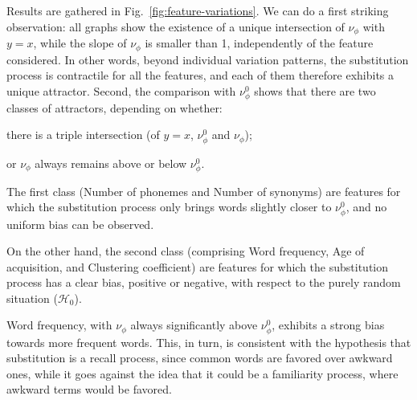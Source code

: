 \medskip
Results are gathered in Fig.~\ref{fig:feature-variations}.
We can do a first striking observation: all graphs show the existence of a unique intersection of $\nu_{\phi}$ with $y=x$, while the slope of $\nu_{\phi}$ is smaller than 1, independently of the feature considered.
In other words, beyond individual variation patterns, the substitution process is contractile for all the features, and each of them therefore exhibits a unique attractor.
Second, the comparison with $\nu_{\phi}^0$ shows that there are two classes of attractors, depending on whether:
\begin{APAenumerate} 
\item there is a triple intersection (of $y=x$, $\nu_{\phi}^0$ and $\nu_{\phi}$);
\item or $\nu_{\phi}$ always remains above or below $\nu_{\phi}^0$.
\end{APAenumerate}
The first class (Number of phonemes and Number of synonyms) are features for which the substitution process only brings words slightly closer to $\nu_{\phi}^0$, and no uniform bias can be observed.


On the other hand, the second class (comprising Word frequency, Age of acquisition, and Clustering coefficient) are features for which the substitution process has a clear bias, positive or negative, with respect to the purely random situation ($\mathcal{H}_0$).

Word frequency, with $\nu_{\phi}$ always significantly above $\nu_{\phi}^0$, exhibits a strong bias towards more frequent words. This, in turn, is consistent with the hypothesis that substitution is a recall process, since common words are favored over awkward ones, while it goes against the idea that it could be a familiarity process, where awkward terms would be favored.


